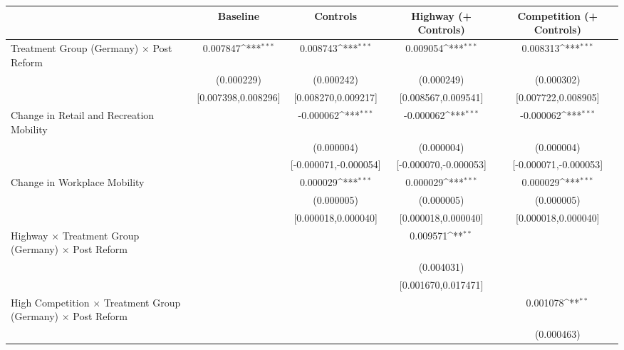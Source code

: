 {
\def\sym#1{\ifmmode^{#1}\else\(^{#1}\)\fi}
\begin{tabular}{l*{4}{c}}
\toprule
                    &\multicolumn{1}{c}{Baseline}&\multicolumn{1}{c}{Controls}&\multicolumn{1}{c}{Highway (+ Controls)}&\multicolumn{1}{c}{Competition (+ Controls)}\\
\midrule
Treatment Group (Germany) $\times$ Post Reform&    0.007847\sym{***}&    0.008743\sym{***}&    0.009054\sym{***}&    0.008313\sym{***}\\
                    &  (0.000229)         &  (0.000242)         &  (0.000249)         &  (0.000302)         \\
                    &[0.007398,0.008296]         &[0.008270,0.009217]         &[0.008567,0.009541]         &[0.007722,0.008905]         \\
Change in Retail and Recreation Mobility&                     &   -0.000062\sym{***}&   -0.000062\sym{***}&   -0.000062\sym{***}\\
                    &                     &  (0.000004)         &  (0.000004)         &  (0.000004)         \\
                    &                     &[-0.000071,-0.000054]         &[-0.000070,-0.000053]         &[-0.000071,-0.000053]         \\
Change in Workplace Mobility&                     &    0.000029\sym{***}&    0.000029\sym{***}&    0.000029\sym{***}\\
                    &                     &  (0.000005)         &  (0.000005)         &  (0.000005)         \\
                    &                     &[0.000018,0.000040]         &[0.000018,0.000040]         &[0.000018,0.000040]         \\
Highway $\times$ Treatment Group (Germany) $\times$ Post Reform&                     &                     &    0.009571\sym{**} &                     \\
                    &                     &                     &  (0.004031)         &                     \\
                    &                     &                     &[0.001670,0.017471]         &                     \\
High Competition $\times$ Treatment Group (Germany) $\times$ Post Reform&                     &                     &                     &    0.001078\sym{**} \\
                    &                     &                     &                     &  (0.000463)         \\

\end{tabular}}
